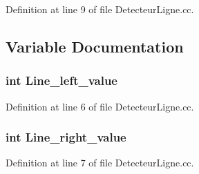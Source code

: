 Definition at line 9 of file Detecteur\+Ligne.\+cc.



\subsection{Variable Documentation}
\subsubsection[{Line\+\_\+left\+\_\+value}]{\setlength{\rightskip}{0pt plus 5cm}int Line\+\_\+left\+\_\+value}\label{_detecteur_ligne_8cc_a4310b98cd2a1d202630cdc6dc83db436}


Definition at line 6 of file Detecteur\+Ligne.\+cc.

\subsubsection[{Line\+\_\+right\+\_\+value}]{\setlength{\rightskip}{0pt plus 5cm}int Line\+\_\+right\+\_\+value}\label{_detecteur_ligne_8cc_a2bfa3927df0682b662dd3de9bde55e40}


Definition at line 7 of file Detecteur\+Ligne.\+cc.


